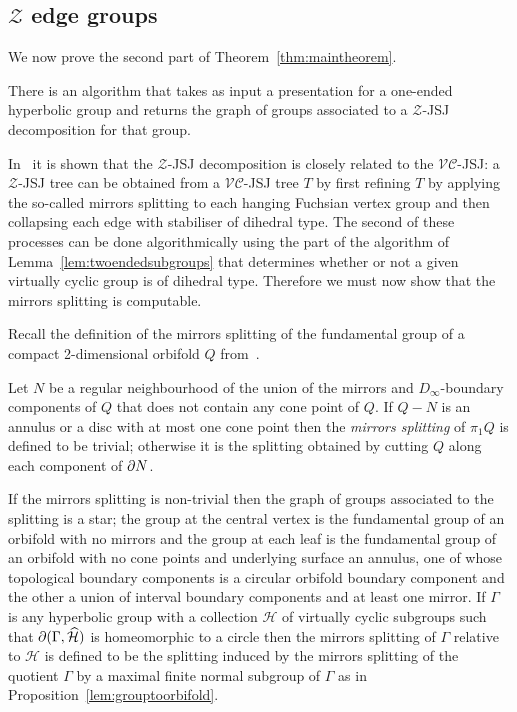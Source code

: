 \subsection{$\mathcal{Z}$ edge groups}

We now prove the second part of Theorem~\ref{thm:maintheorem}.

\begin{thm} There is an algorithm that takes as input a presentation for a
one-ended hyperbolic group and returns the graph of groups associated to a
$\mathcal{Z}$-JSJ decomposition for that group.\end{thm}

In~\cite{dahmaniguirardel11} it is shown that the $\mathcal{Z}$-JSJ
decomposition is closely related to the $\mathcal{VC}$-JSJ: a $\mathcal{Z}$-JSJ
tree can be obtained from a $\mathcal{VC}$-JSJ tree $T$ by first refining $T$
by applying the so-called mirrors splitting to each hanging Fuchsian vertex group and
then collapsing each edge with stabiliser of dihedral type. 
The second of these processes can be done algorithmically using the part of the
algorithm of Lemma~\ref{lem:twoendedsubgroups} that determines whether or not a
given virtually cyclic group is of dihedral type.  Therefore we must now show
that the mirrors splitting is computable.

Recall the definition of the mirrors splitting of the fundamental group of a
compact 2-dimensional orbifold $Q$ from~\cite{dahmaniguirardel11}. 

\begin{defn} Let $N$ be
a regular neighbourhood of the union of the mirrors and $D_\infty$-boundary
components of $Q$ that does not contain any cone point of $Q$. If $Q - N$ is an
annulus or a disc with at most one cone point then the \emph{mirrors splitting} of
$\pi_1Q$ is defined to be trivial; otherwise it is the splitting obtained by
cutting $Q$ along each component of $\partial N$. \end{defn}

If the mirrors splitting is non-trivial then the graph of groups associated to the splitting is a star; the group at the central
vertex is the fundamental group of an orbifold with no mirrors and the group at
each leaf is the fundamental group of an orbifold with no cone points and
underlying surface an annulus, one of whose topological boundary components is
a circular orbifold boundary component and the other a union of interval
boundary components and at least one mirror. If $\Gamma$ is any hyperbolic
group with a collection $\mathcal{H}$ of virtually cyclic subgroups such that
$\partial(\Gamma, \widehat{\mathcal{H}})$ is homeomorphic to a circle then the mirrors
splitting of $\Gamma$ relative to $\mathcal{H}$ is defined to be the splitting
induced by the mirrors splitting of the quotient $\Gamma$ by a maximal finite
normal subgroup of $\Gamma$ as in Proposition~\ref{lem:grouptoorbifold}.

